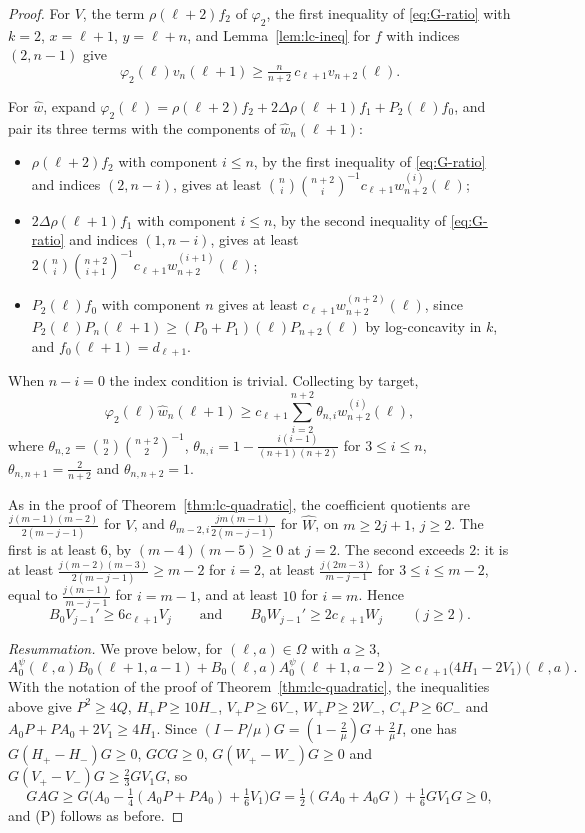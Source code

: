 \begin{proof}
For $V$, the term $\rho(\ell+2)f_2$ of $\varphi_2$, the first inequality of \eqref{eq:G-ratio} with $k=2$, $x=\ell+1$, $y=\ell+n$, and Lemma~\ref{lem:lc-ineq} for $f$ with indices $(2,n-1)$ give
\[
\varphi_2(\ell)v_n(\ell+1)\geq\tfrac n{n+2}\,c_{\ell+1}v_{n+2}(\ell).
\]

For $\widehat w$, expand $\varphi_2(\ell)=\rho(\ell+2)f_2+2\Delta\rho(\ell+1)f_1+P_2(\ell)f_0$, and pair its three terms with the components of $\widehat w_n(\ell+1)$:
\begin{itemize}
\item $\rho(\ell+2)f_2$ with component $i\leq n$, by the first inequality of \eqref{eq:G-ratio} and indices $(2,n-i)$, gives at least $\binom ni\binom{n+2}i^{-1}c_{\ell+1}w^{(i)}_{n+2}(\ell)$;
\item $2\Delta\rho(\ell+1)f_1$ with component $i\leq n$, by the second inequality of \eqref{eq:G-ratio} and indices $(1,n-i)$, gives at least $2\binom ni\binom{n+2}{i+1}^{-1}c_{\ell+1}w^{(i+1)}_{n+2}(\ell)$;
\item $P_2(\ell)f_0$ with component $n$ gives at least $c_{\ell+1}w^{(n+2)}_{n+2}(\ell)$, since $P_2(\ell)P_n(\ell+1)\geq(P_0+P_1)(\ell)P_{n+2}(\ell)$ by log-concavity in $k$, and $f_0(\ell+1)=d_{\ell+1}$.
\end{itemize}
When $n-i=0$ the index condition is trivial. Collecting by target,
\[
\varphi_2(\ell)\widehat w_n(\ell+1)\geq c_{\ell+1}\sum_{i=2}^{n+2}\theta_{n,i}w^{(i)}_{n+2}(\ell),
\]
where $\theta_{n,2}=\binom n2\binom{n+2}2^{-1}$, $\theta_{n,i}=1-\frac{i(i-1)}{(n+1)(n+2)}$ for $3\leq i\leq n$, $\theta_{n,n+1}=\frac2{n+2}$ and $\theta_{n,n+2}=1$.

As in the proof of Theorem~\ref{thm:lc-quadratic}, the coefficient quotients are $\frac{j(m-1)(m-2)}{2(m-j-1)}$ for $V$, and $\theta_{m-2,i}\frac{jm(m-1)}{2(m-j-1)}$ for $\widehat W$, on $m\geq2j+1$, $j\geq2$. The first is at least $6$, by $(m-4)(m-5)\geq0$ at $j=2$. The second exceeds $2$: it is at least $\frac{j(m-2)(m-3)}{2(m-j-1)}\geq m-2$ for $i=2$, at least $\frac{j(2m-3)}{m-j-1}$ for $3\leq i\leq m-2$, equal to $\frac{j(m-1)}{m-j-1}$ for $i=m-1$, and at least $10$ for $i=m$. Hence
\[
B_0V_{j-1}'\geq6c_{\ell+1}V_j\qquad\text{and}\qquad B_0W_{j-1}'\geq2c_{\ell+1}W_j\qquad(j\geq2).
\]

\emph{Resummation.} We prove below, for $(\ell,a)\in\Omega$ with $a\geq3$,
\begin{equation}\label{eq:G-key}
A^\psi_0(\ell,a)B_0(\ell+1,a-1)+B_0(\ell,a)A^\psi_0(\ell+1,a-2)\geq c_{\ell+1}\bigl(4H_1-2V_1\bigr)(\ell,a).
\end{equation}
With the notation of the proof of Theorem~\ref{thm:lc-quadratic}, the inequalities above give $P^2\geq4Q$, $H_+P\geq10H_-$, $V_+P\geq6V_-$, $W_+P\geq2W_-$, $C_+P\geq6C_-$ and $A_0P+PA_0+2V_1\geq4H_1$. Since $(I-P/\mu)G=(1-\frac2\mu)G+\frac2\mu I$, one has $G(H_+-H_-)G\geq0$, $GCG\geq0$, $G(W_+-W_-)G\geq0$ and $G(V_+-V_-)G\geq\frac23GV_1G$, so
\[
GAG\geq G\bigl(A_0-\tfrac14(A_0P+PA_0)+\tfrac16V_1\bigr)G=\tfrac12(GA_0+A_0G)+\tfrac16GV_1G\geq0,
\]
and (P) follows as before.


\end{proof}
